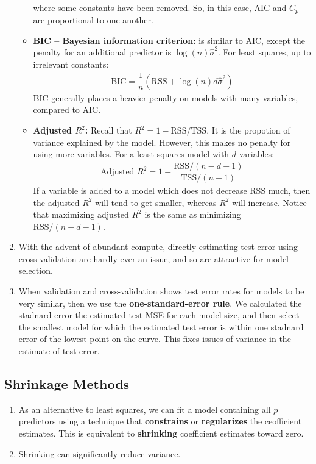 \documentclass[10pt]{article}
\begin{document}
\begin{enumerate}
\begin{itemize}
\begin{align*}
		\end{align*}
		where some constants have been removed.  So, in this case, AIC and $C_p$ are proportional to one another.
		\item \textbf{BIC -- Bayesian information criterion:} is similar to AIC, except the penalty for an additional predictor is $\log(n) \hat \sigma^2$.  For least squares, up to irrelevant constants: 
		\begin{align*}
			\mathrm{BIC} = \dfrac{1}{n} (\mathrm{RSS} + \log(n)d \hat\sigma^2)
		\end{align*}
		BIC generally places a heavier penalty on models with many variables, compared to AIC.
		\item \textbf{Adjusted $R^2$:} Recall that $R^2 = 1 - \mathrm{RSS}/\mathrm{TSS}$.  It is the propotion of variance explained by the model.  However, this makes no penalty for using more variables.  For a least squares model with $d$ variables:
		\begin{align*}
			\text{Adjusted $R^2$} = 1 - \dfrac{\mathrm{RSS}/(n - d - 1)}{\mathrm{TSS}/(n - 1)}
		\end{align*}
		If a variable is added to a model which does not decrease RSS much, then the adjusted $R^2$ will tend to get smaller, whereas $R^2$ will increase.  Notice that maximizing adjusted $R^2$ is the same as minimizing $\mathrm{RSS}/(n - d - 1)$.
	\end{itemize}
	\item With the advent of abundant compute, directly estimating test error using cross-validation are hardly ever an issue, and so are attractive for model selection.
	\item When validation and cross-validation shows test error rates for models to be very similar, then we use the \textbf{one-standard-error rule}.  We calculated the stadnard error the estimated test MSE for each model size, and then select the smallest model for which the estimated test error is within one stadnard error of the lowest point on the curve.  This fixes issues of variance in the estimate of test error.
\end{enumerate}

\subsection{Shrinkage Methods} 
\begin{enumerate}
	\item As an alternative to least squares, we can fit a model containing all $p$ predictors using a technique that \textbf{constrains} or \textbf{regularizes} the ceofficient estimates.  This is equivalent to \textbf{shrinking} coefficient estimates toward zero.
	\item Shrinking can significantly reduce variance.
\end{enumerate}
\end{document}
